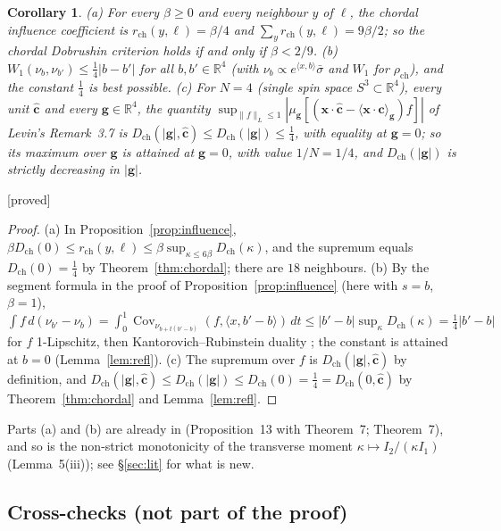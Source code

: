 \documentclass[11pt,a4paper]{article}
\newtheorem{corollary}[theorem]{Corollary}
\theoremstyle{remark}
\theoremstyle{definition}
\theoremstyle{plain}
\theoremstyle{remark}
\newcommand{\R}{\mathbb{R}}
\newcommand{\Cov}{\operatorname{Cov}}
\newcommand{\st}[1]{\textsf{[#1]}}
\newcommand{\Dch}{D_{\mathrm{ch}}}
\newcommand{\rch}{\rho_{\mathrm{ch}}}
\begin{document}
\begin{corollary}\label{cor:chordal}
(a) For every $\beta\ge0$ and every neighbour $y$ of $\ell$, the chordal influence coefficient is $r_{\mathrm{ch}}(y,\ell)=\beta/4$ and
$\sum_yr_{\mathrm{ch}}(y,\ell)=9\beta/2$; so the chordal Dobrushin criterion holds if and only if $\beta<2/9$.
(b) $W_1(\nu_b,\nu_{b'})\le\frac14|b-b'|$ for all $b,b'\in\R^4$ (with $\nu_b\propto e^{\langle x,b\rangle}\bar\sigma$ and $W_1$ for $\rch$), and the constant $\frac14$ is best possible.
(c) For $N=4$ (single spin space $S^3\subset\R^4$), every unit $\hat{\mathbf c}$ and every $\mathbf g\in\R^4$, the quantity
$\sup_{\|f\|_L\le1}|\mu_{\mathbf g}[(\mathbf x\cdot\hat{\mathbf c}-\langle\mathbf x\cdot\hat{\mathbf c}\rangle_{\mathbf g})f]|$ of Levin's Remark~3.7 is $\Dch(|\mathbf g|,\hat{\mathbf c})\le\Dch(|\mathbf g|)\le\frac14$,
with equality at $\mathbf g=0$; so its maximum over $\mathbf g$ is attained at $\mathbf g=0$, with value $1/N=1/4$, and $\Dch(|\mathbf g|)$ is strictly decreasing in $|\mathbf g|$.
\end{corollary}
\noindent\st{proved}
\begin{proof}
(a) In Proposition~\ref{prop:influence}, $\beta\Dch(0)\le r_{\mathrm{ch}}(y,\ell)\le\beta\sup_{\kappa\le6\beta}\Dch(\kappa)$, and the supremum equals $\Dch(0)=\frac14$ by Theorem~\ref{thm:chordal}; there are
$18$ neighbours. (b) By the segment formula in the proof of Proposition~\ref{prop:influence} (here with $s=b$, $\beta=1$), $\int f\,d(\nu_{b'}-\nu_b)=\int_0^1\Cov_{\nu_{b+t(b'-b)}}(f,\langle x,b'-b\rangle)\,dt
\le|b'-b|\sup_\kappa\Dch(\kappa)=\frac14|b'-b|$ for $f$ 1-Lipschitz, then Kantorovich--Rubinstein duality \cite[Thm~10.8]{DS25}; the constant is attained at $b=0$ (Lemma~\ref{lem:refl}).
(c) The supremum over $f$ is $\Dch(|\mathbf g|,\hat{\mathbf c})$ by definition, and $\Dch(|\mathbf g|,\hat{\mathbf c})\le\Dch(|\mathbf g|)\le\Dch(0)=\frac14=\Dch(0,\hat{\mathbf c})$ by Theorem~\ref{thm:chordal} and Lemma~\ref{lem:refl}.
\end{proof}
Parts (a) and (b) are already in \cite{BB26} (Proposition~13 with Theorem~7; Theorem~7), and so is the non-strict monotonicity of the transverse moment $\kappa\mapsto I_2/(\kappa I_1)$ (Lemma~5(iii)); see \S\ref{sec:lit} for what is new.

\subsection{Cross-checks (not part of the proof)}\label{sec:chcross}
\end{document}
